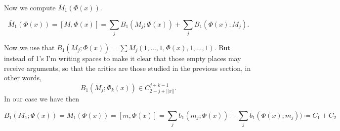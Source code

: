 \documentclass[twoside]{article}
\begin{document}
%
%
%
%
%
%
%
%
%
%

Now we compute $\overline{M}_1(\Phi(x))$.

\begin{equation}\label{eme}
\overline{M}_1(\Phi(x))=[M,\Phi(x)]=\sum_j B_1(M_j;\Phi(x))+\sum_j B_1(\Phi(x);M_j).
\end{equation}

Now we use that $B_1(M_j;\Phi(x))=\sum M_j(1,\dots, 1,\Phi(x),1,\dots, 1)$. But instead of 1's I'm writing spaces to make it clear that those empty places may receive arguments, so that the arities are those studied in the previous section, in other words, $$B_1(M_j;\Phi_k(x))\in C^{j+k-1}_{2-j+||x||}.$$ In our case we have then

$$
B_1(M_1;\Phi(x))=M_1(\Phi(x))=[m,\Phi(x)]=\sum_j b_1(m_j;\Phi(x))+\sum_j b_1(\Phi(x);m_j))\coloneqq C_1+C_2
$$
\end{document}
